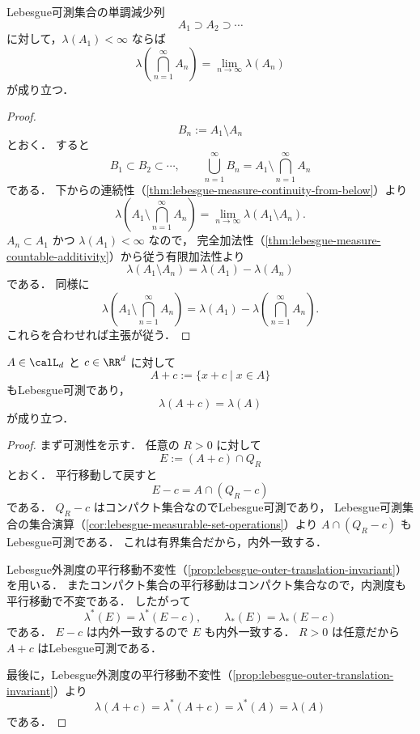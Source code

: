 \begin{theorem}[上からの連続性]\label{thm:lebesgue-measure-continuity-from-above}
Lebesgue可測集合の単調減少列
\[
A_1\supset A_2\supset\cdots
\]
に対して，$\lambda(A_1)<\infty$ ならば
\[
\lambda\left(\bigcap_{n=1}^{\infty}A_n\right)
=
\lim_{n\to\infty}\lambda(A_n)
\]
が成り立つ．
\end{theorem}
\begin{proof}
\[
B_n:=A_1\setminus A_n
\]
とおく．
すると
\[
B_1\subset B_2\subset\cdots,
\qquad
\bigcup_{n=1}^{\infty}B_n
=
A_1\setminus\bigcap_{n=1}^{\infty}A_n
\]
である．
下からの連続性（\cref{thm:lebesgue-measure-continuity-from-below}）より
\[
\lambda\left(A_1\setminus\bigcap_{n=1}^{\infty}A_n\right)
=
\lim_{n\to\infty}\lambda(A_1\setminus A_n).
\]
$A_n\subset A_1$ かつ $\lambda(A_1)<\infty$ なので，
完全加法性（\cref{thm:lebesgue-measure-countable-additivity}）から従う有限加法性より
\[
\lambda(A_1\setminus A_n)=\lambda(A_1)-\lambda(A_n)
\]
である．
同様に
\[
\lambda\left(A_1\setminus\bigcap_{n=1}^{\infty}A_n\right)
=
\lambda(A_1)-\lambda\left(\bigcap_{n=1}^{\infty}A_n\right).
\]
これらを合わせれば主張が従う．
\end{proof}

\begin{proposition}[平行移動不変性]\label{prop:lebesgue-measure-translation-invariant}
$A\in\calL_d$ と $c\in\RR^d$ に対して
\[
A+c:=\{x+c\mid x\in A\}
\]
もLebesgue可測であり，
\[
\lambda(A+c)=\lambda(A)
\]
が成り立つ．
\end{proposition}
\begin{proof}
まず可測性を示す．
任意の $R>0$ に対して
\[
E:=(A+c)\cap Q_R
\]
とおく．
平行移動して戻すと
\[
E-c=A\cap(Q_R-c)
\]
である．
$Q_R-c$ はコンパクト集合なのでLebesgue可測であり，
Lebesgue可測集合の集合演算（\cref{cor:lebesgue-measurable-set-operations}）より
$A\cap(Q_R-c)$ もLebesgue可測である．
これは有界集合だから，内外一致する．

Lebesgue外測度の平行移動不変性（\cref{prop:lebesgue-outer-translation-invariant}）を用いる．
またコンパクト集合の平行移動はコンパクト集合なので，内測度も平行移動で不変である．
したがって
\[
\lambda^*(E)=\lambda^*(E-c),
\qquad
\lambda_*(E)=\lambda_*(E-c)
\]
である．
$E-c$ は内外一致するので $E$ も内外一致する．
$R>0$ は任意だから $A+c$ はLebesgue可測である．

最後に，Lebesgue外測度の平行移動不変性（\cref{prop:lebesgue-outer-translation-invariant}）より
\[
\lambda(A+c)=\lambda^*(A+c)=\lambda^*(A)=\lambda(A)
\]
である．
\end{proof}
